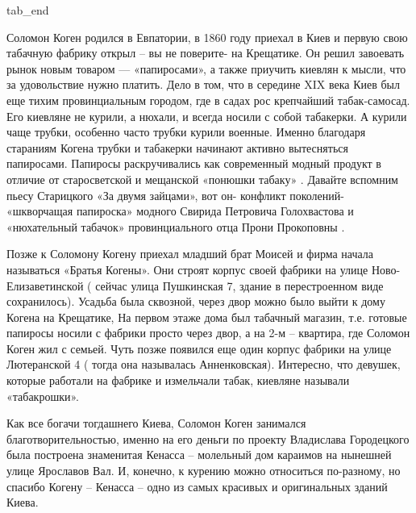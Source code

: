   tab_end
\fi

Соломон Коген родился в Евпатории, в 1860 году приехал в Киев и первую свою
табачную фабрику открыл – вы не поверите- на Крещатике. Он решил завоевать
рынок новым товаром — «папиросами», а также приучить киевлян к мысли, что за
удовольствие нужно платить. Дело в том, что в середине XIX века Киев был еще
тихим провинциальным городом, где в садах рос крепчайший табак-самосад. Его
киевляне не курили, а нюхали, и всегда носили с собой табакерки. А курили чаще
трубки, особенно часто трубки курили военные.  Именно благодаря стараниям
Когена трубки и табакерки начинают активно вытесняться папиросами. Папиросы
раскручивались как современный модный продукт в отличие от старосветской и
мещанской  «понюшки табаку» . Давайте вспомним пьесу Старицкого «За двумя
зайцами», вот он- конфликт поколений- «шкворчащая папироска» модного Свирида
Петровича Голохвастова и «нюхательный табачок» провинциального отца Прони
Прокоповны .

Позже к Соломону Когену приехал младший брат Моисей и фирма начала называться
«Братья Когены». Они строят корпус своей фабрики на улице Ново-Елизаветинской (
сейчас улица Пушкинская 7, здание в перестроенном виде сохранилось). Усадьба
была сквозной, через двор можно было выйти к дому Когена  на Крещатике, На
первом этаже дома был табачный магазин, т.е. готовые папиросы носили с фабрики
просто через двор,  а на 2-м – квартира, где Соломон Коген жил с семьей. Чуть
позже появился еще один корпус фабрики на улице Лютеранской 4 ( тогда она
называлась Анненковская). Интересно, что девушек, которые работали на фабрике и
измельчали табак, киевляне называли «табакрошки».  

Как все богачи тогдашнего Киева, Соломон Коген занимался благотворительностью,
именно на его деньги по проекту Владислава Городецкого была построена
знаменитая Кенасса – молельный дом караимов на нынешней улице Ярославов Вал. И,
конечно, к курению можно относиться по-разному, но спасибо Когену – Кенасса –
одно из самых красивых и оригинальных зданий Киева.

